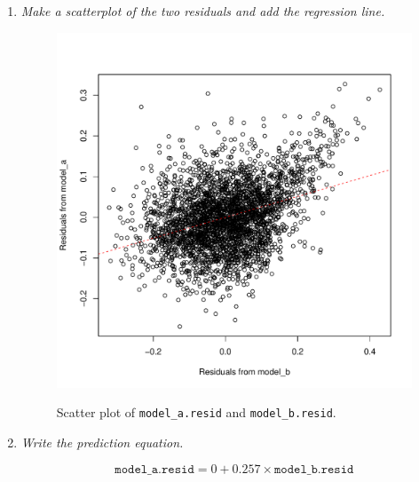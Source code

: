 \documentclass[12pt,letterpaper]{article}
\begin{document}
\begin{enumerate}
		\item \emph{Make a scatterplot of the two residuals and add the regression line.} 		\vspace{.25cm}
		
		
		\begin{figure}[h!]\centering
			\caption{\footnotesize Scatter plot of \texttt{model\_a.resid} and \texttt{model\_b.resid}.}\vspace{-1cm}
			\label{fig:Q4_b}
			\includegraphics[width=.65\textwidth]{Q4_b.pdf}\\
		\end{figure}
\newpage
		\item \emph{Write the prediction equation.}	\vspace{.25cm}
		
		
		\begin{equation*}
		\texttt{model\_a.resid} =  0 + 0.257 \times \texttt{model\_b.resid}
		\end{equation*}
	\end{enumerate}\vspace{.25cm}
	
\end{document}

